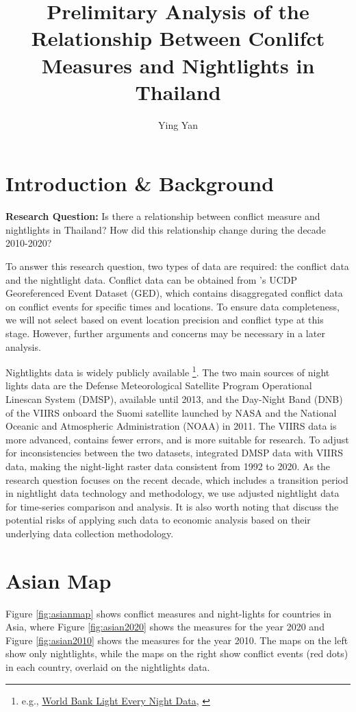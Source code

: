 \documentclass[11pt]{article}
\title{Prelimitary Analysis of the Relationship Between Conlifct Measures and Nightlights in Thailand}
\author{Ying Yan}
\begin{document}
\maketitle

\section*{Introduction \& Background}

\textbf{Research Question:} Is there a relationship between conflict measure and nightlights in Thailand? How did this relationship change during the decade 2010-2020?

To answer this research question, two types of data are required: the conflict data and the nightlight data. Conflict data can be obtained from \textcite{davies_organized_2025}'s UCDP Georeferenced Event Dataset (GED), which contains disaggregated conflict data on conflict events for specific times and locations. To ensure data completeness, we will not select based on event location precision and conflict type at this stage. However, further arguments and concerns may be necessary in a later analysis.

Nightlights data is widely publicly available \footnote{e.g., \href{https://worldbank.github.io/OpenNightLights/wb-light-every-night-readme.html}{World Bank Light Every Night Data}, \textcite{Li2020}}. The two main sources of night lights data are the Defense Meteorological Satellite Program Operational Linescan System (DMSP), available until 2013, and the Day-Night Band (DNB) of the VIIRS onboard the Suomi satellite launched by NASA and the National Oceanic and Atmospheric Administration (NOAA) in 2011. The VIIRS data is more advanced, contains fewer errors, and is more suitable for research. To adjust for inconsistencies between the two datasets, \textcite{Li2020} integrated DMSP data with VIIRS data, making the night-light raster data consistent from 1992 to 2020. As the research question focuses on the recent decade, which includes a transition period in nightlight data technology and methodology, we use \textcite{Li2020} adjusted nightlight data for time-series comparison and analysis. It is also worth noting that \textcite{gibson_night_2020} discuss the potential risks of applying such data to economic analysis based on their underlying data collection methodology.

\newpage
\section{Asian Map}
Figure \ref{fig:asianmap} shows conflict measures and night-lights for countries in Asia, where Figure \ref{fig:asian2020} shows the measures for the year 2020 and Figure \ref{fig:asian2010} shows the measures for the year 2010. The maps on the left show only nightlights, while the maps on the right show conflict events (red dots) in each country, overlaid on the nightlights data.
\end{document}
